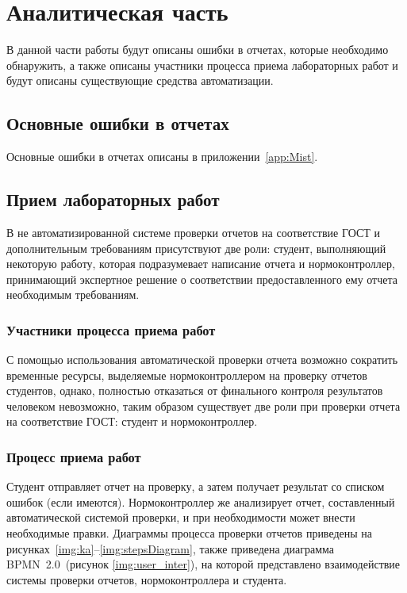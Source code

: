 
\chapter{Аналитическая часть}
В данной части работы будут описаны ошибки в отчетах, которые необходимо обнаружить, а также описаны участники процесса приема лабораторных работ и  будут описаны существующие средства автоматизации.

\section{Основные ошибки в отчетах}
Основные ошибки в отчетах описаны в приложении~\ref{app:Mist}.

\section{Прием лабораторных работ}
В не автоматизированной системе проверки отчетов на соответствие ГОСТ и дополнительным требованиям присутствуют две роли: студент, выполняющий некоторую работу, которая подразумевает написание отчета и нормоконтроллер, принимающий экспертное решение о соответствии предоставленного ему отчета необходимым требованиям.
\subsection{Участники процесса приема работ}
С помощью использования автоматической проверки отчета возможно
сократить временные ресурсы, выделяемые нормоконтроллером на проверку
отчетов студентов, однако, полностью отказаться от финального контроля
результатов человеком невозможно, таким образом существует две роли при
проверки отчета на соответствие ГОСТ: студент и нормоконтроллер.

\subsection{Процесс приема работ}

Студент отправляет отчет на проверку, а затем получает результат со
списком ошибок (если имеются). Нормоконтроллер же анализирует отчет,
составленный автоматической системой проверки, и при необходимости может
внести необходимые правки. Диаграммы процесса проверки отчетов приведены на рисунках~\ref{img:ka}--\ref{img:stepsDiagram}, также приведена диаграмма BPMN~2.0~(рисунок \ref{img:user_inter}), на которой представлено взаимодействие системы проверки отчетов, нормоконтроллера и студента.

